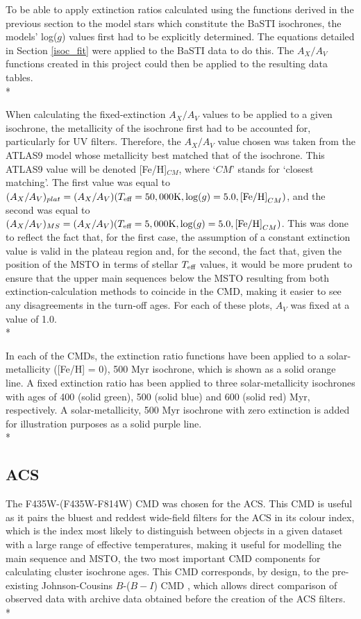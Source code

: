 \documentclass[12pt, a4paper]{report}
\begin{document}
To be able to apply extinction ratios calculated using the functions derived in the previous section to the model stars which constitute the BaSTI isochrones, the models' log($g$) values first had to be explicitly determined. The equations detailed in Section \ref{isoc_fit} were applied to the BaSTI data to do this. The $A_{X}/A_{V}$ functions created in this project could then be applied to the resulting data tables. \\*

When calculating the fixed-extinction $A_{X}/A_{V}$ values to be applied to a given isochrone, the metallicity of the isochrone first had to be accounted for, particularly for UV filters. Therefore, the $A_{X}/A_{V}$ value chosen was taken from the ATLAS9 model whose metallicity best matched that of the isochrone. This ATLAS9 value will be denoted [Fe/H]$_{CM}$, where `$CM$' stands for `closest matching'. The first value was equal to $(A_{X}/A_{V})_{plat} = (A_{X}/A_{V})(T_{\textnormal{eff}} = 50,000\textnormal{K},\log(g) = 5.0,\textnormal{[Fe/H]}_{CM})$, and the second was equal to $(A_{X}/A_{V})_{MS} = (A_{X}/A_{V})(T_{\textnormal{eff}} = 5,000\textnormal{K},\log(g) = 5.0,\textnormal{[Fe/H]}_{CM})$. This was done to reflect the fact that, for the first case, the assumption of a constant extinction value is valid in the plateau region and, for the second, the fact that, given the position of the MSTO in terms of stellar $T_{\textnormal{eff}}$ values, it would be more prudent to ensure that the upper main sequences below the MSTO resulting from both extinction-calculation methods to coincide in the CMD, making it easier to see any disagreements in the turn-off ages. For each of these plots, $A_{V}$ was fixed at a value of 1.0.\\*

In each of the CMDs, the extinction ratio functions have been applied to a solar-metallicity ([Fe/H] = 0), 500 Myr isochrone, which is shown as a solid orange line. A fixed extinction ratio has been applied to three solar-metallicity isochrones with ages of 400 (solid green), 500 (solid blue) and 600 (solid red) Myr, respectively. A solar-metallicity, 500 Myr isochrone with zero extinction is added for illustration purposes as a solid purple line.\\*

\subsection{ACS} \label{ACS_isoc}
The F435W-(F435W-F814W) CMD was chosen for the ACS. This CMD is useful as it pairs the bluest and reddest wide-field filters for the ACS in its colour index, which is the index most likely to distinguish between objects in a given dataset with a large range of effective temperatures, making it useful for modelling the main sequence and MSTO, the two most important CMD components for calculating cluster isochrone ages. This CMD corresponds, by design, to the pre-existing Johnson-Cousins $B$-($B-I$) CMD \citep{2005PASP..117.1049S}, which allows direct comparison of observed data with archive data obtained before the creation of the ACS filters.\\*
\end{document}
